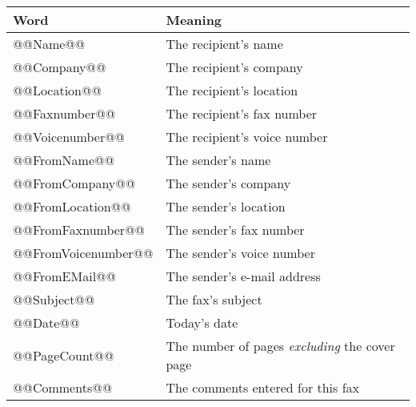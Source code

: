 \documentclass[a4paper,10pt]{scrartcl}
\begin{document}
\begin{center}
\begin{tabular}{|l|l|}
\hline
\bfseries Word & \bfseries Meaning \\
\hline\hline
\ttfamily @@Name@@ & The recipient's name \\\hline
\ttfamily @@Company@@ & The recipient's company \\\hline
\ttfamily @@Location@@ & The recipient's location \\\hline
\ttfamily @@Faxnumber@@ & The recipient's fax number \\\hline
\ttfamily @@Voicenumber@@ & The recipient's voice number \\\hline
\ttfamily @@FromName@@ & The sender's name \\\hline
\ttfamily @@FromCompany@@ & The sender's company \\\hline
\ttfamily @@FromLocation@@ & The sender's location \\\hline
\ttfamily @@FromFaxnumber@@ & The sender's fax number \\\hline
\ttfamily @@FromVoicenumber@@ & The sender's voice number \\\hline
\ttfamily @@FromEMail@@ & The sender's e-mail address \\\hline
\ttfamily @@Subject@@ & The fax's subject \\\hline
\ttfamily @@Date@@ & Today's date \\\hline
\ttfamily @@PageCount@@ & The number of pages \textit{excluding} the cover page \\\hline
\ttfamily @@Comments@@ & The comments entered for this fax \\\hline
\end{tabular}
\end{center}
\end{document}
